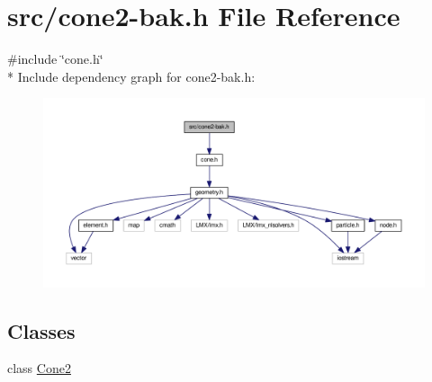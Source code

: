 \hypertarget{cone2-bak_8h}{\section{src/cone2-\/bak.h File Reference}
\label{cone2-bak_8h}
}
{\ttfamily \#include \char`\"{}cone.\-h\char`\"{}}\\*
Include dependency graph for cone2-\/bak.h\-:
\nopagebreak
\begin{figure}[H]
\begin{center}
\leavevmode
\includegraphics[width=350pt]{cone2-bak_8h__incl}
\end{center}
\end{figure}
\subsection*{Classes}
\begin{DoxyCompactItemize}
\item 
class \hyperlink{classCone2}{Cone2}
\end{DoxyCompactItemize}
